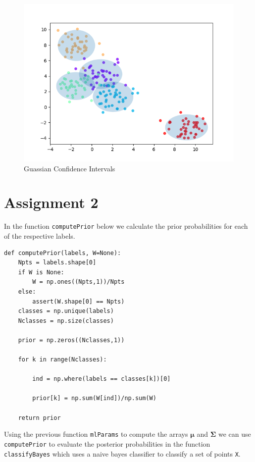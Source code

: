 \documentclass{article}
\begin{document}
\begin{figure}
    \centering
    \includegraphics[scale = 0.75]{Figure_1.png}
    \caption{Guassian Confidence Intervals}
\end{figure}


\section*{Assignment 2}

In the function \texttt{computePrior} below we calculate the prior probabilities for each of the respective labels. 

\begin{lstlisting}
def computePrior(labels, W=None):
    Npts = labels.shape[0]
    if W is None:
        W = np.ones((Npts,1))/Npts
    else:
        assert(W.shape[0] == Npts)
    classes = np.unique(labels)
    Nclasses = np.size(classes)

    prior = np.zeros((Nclasses,1))
    
    for k in range(Nclasses):
        
        ind = np.where(labels == classes[k])[0]
        
        prior[k] = np.sum(W[ind])/np.sum(W)

    return prior
\end{lstlisting}

Using the previous function \texttt{mlParams} to compute the arrays $\boldsymbol\mu$ and $\boldsymbol\Sigma$ we can use \texttt{computePrior} to evaluate the posterior probabilities in the function \texttt{classifyBayes} which uses a naive bayes classifier to classify a set of points \texttt{X}.
\end{document}
